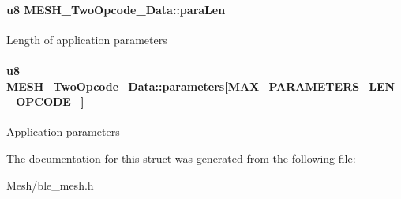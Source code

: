 \paragraph[{\texorpdfstring{para\+Len}{paraLen}}]{\setlength{\rightskip}{0pt plus 5cm}u8 M\+E\+S\+H\+\_\+\+Two\+Opcode\+\_\+\+Data\+::para\+Len}\hypertarget{struct_m_e_s_h___two_opcode___data_ad040cbe20d3fd3cfbfe0ea5385a2e8e7}{}\label{struct_m_e_s_h___two_opcode___data_ad040cbe20d3fd3cfbfe0ea5385a2e8e7}
Length of application parameters 
\paragraph[{\texorpdfstring{parameters}{parameters}}]{\setlength{\rightskip}{0pt plus 5cm}u8 M\+E\+S\+H\+\_\+\+Two\+Opcode\+\_\+\+Data\+::parameters\mbox{[}{\bf M\+A\+X\+\_\+\+P\+A\+R\+A\+M\+E\+T\+E\+R\+S\+\_\+\+L\+E\+N\+\_\+\+O\+P\+C\+O\+D\+E\+\_}\mbox{]}}\hypertarget{struct_m_e_s_h___two_opcode___data_a818cca5aff319e42c3ab88812d5c6dd1}{}\label{struct_m_e_s_h___two_opcode___data_a818cca5aff319e42c3ab88812d5c6dd1}
Application parameters 

The documentation for this struct was generated from the following file\+:\begin{DoxyCompactItemize}
\item 
Mesh/ble\+\_\+mesh.\+h\end{DoxyCompactItemize}
